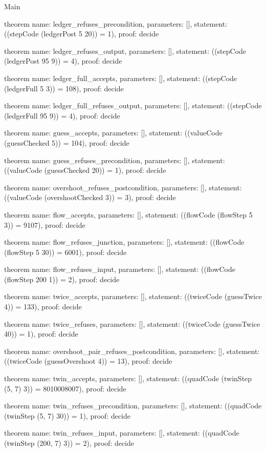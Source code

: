 \begin{lexlean}{Main}
\begin{semanticmodule}
theorem{
  name: ledger_refuses_precondition,
  parameters: [],
  statement: ((stepCode (ledgerPost 5 20)) = 1),
  proof: decide{}
}

theorem{
  name: ledger_refuses_output,
  parameters: [],
  statement: ((stepCode (ledgerPost 95 9)) = 4),
  proof: decide{}
}

theorem{
  name: ledger_full_accepts,
  parameters: [],
  statement: ((stepCode (ledgerFull 5 3)) = 108),
  proof: decide{}
}

theorem{
  name: ledger_full_refuses_output,
  parameters: [],
  statement: ((stepCode (ledgerFull 95 9)) = 4),
  proof: decide{}
}

theorem{
  name: guess_accepts,
  parameters: [],
  statement: ((valueCode (guessChecked 5)) = 104),
  proof: decide{}
}

theorem{
  name: guess_refuses_precondition,
  parameters: [],
  statement: ((valueCode (guessChecked 20)) = 1),
  proof: decide{}
}

theorem{
  name: overshoot_refuses_postcondition,
  parameters: [],
  statement: ((valueCode (overshootChecked 3)) = 3),
  proof: decide{}
}

theorem{
  name: flow_accepts,
  parameters: [],
  statement: ((flowCode (flowStep 5 3)) = 9107),
  proof: decide{}
}

theorem{
  name: flow_refuses_junction,
  parameters: [],
  statement: ((flowCode (flowStep 5 30)) = 6001),
  proof: decide{}
}

theorem{
  name: flow_refuses_input,
  parameters: [],
  statement: ((flowCode (flowStep 200 1)) = 2),
  proof: decide{}
}

theorem{
  name: twice_accepts,
  parameters: [],
  statement: ((twiceCode (guessTwice 4)) = 133),
  proof: decide{}
}

theorem{
  name: twice_refuses,
  parameters: [],
  statement: ((twiceCode (guessTwice 40)) = 1),
  proof: decide{}
}

theorem{
  name: overshoot_pair_refuses_postcondition,
  parameters: [],
  statement: ((twiceCode (guessOvershoot 4)) = 13),
  proof: decide{}
}

theorem{
  name: twin_accepts,
  parameters: [],
  statement: ((quadCode (twinStep (5, 7) 3)) = 8010008007),
  proof: decide{}
}

theorem{
  name: twin_refuses_precondition,
  parameters: [],
  statement: ((quadCode (twinStep (5, 7) 30)) = 1),
  proof: decide{}
}

theorem{
  name: twin_refuses_input,
  parameters: [],
  statement: ((quadCode (twinStep (200, 7) 3)) = 2),
  proof: decide{}
}


\end{semanticmodule}
\end{lexlean}
